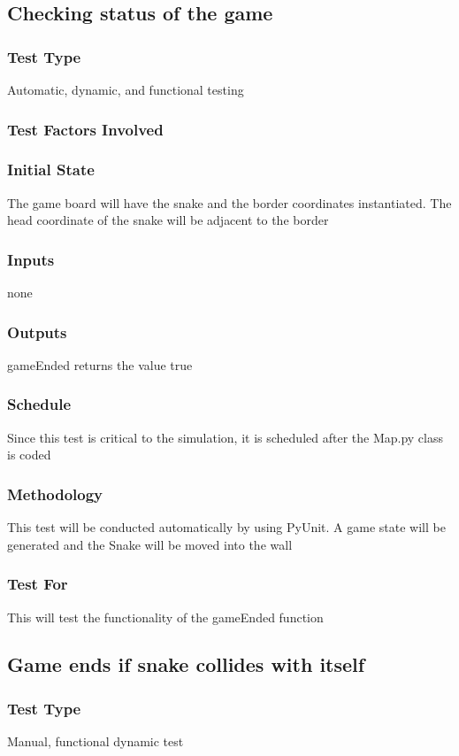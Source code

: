 \documentclass[12pt]{article}
\begin{document}
\noindent
\subsection{Checking status of the game}
\subsubsection*{Test Type}
Automatic, dynamic, and functional testing
\subsubsection*{Test Factors Involved}
\subsubsection*{Initial State}
The game board will have the snake and the border coordinates instantiated. The head coordinate of the snake will be adjacent to the border 
\subsubsection*{Inputs}
none
\subsubsection*{Outputs}
gameEnded returns the value true
\subsubsection*{Schedule}
Since this test is critical to the simulation, it is scheduled after the Map.py class is coded
\subsubsection*{Methodology}
This test will be conducted automatically by using PyUnit. A game state will be generated and the Snake will be moved into the wall
\subsubsection*{Test For}
This will test the functionality of the gameEnded function \newline

\noindent
\subsection{Game ends if snake collides with itself}
\subsubsection*{Test Type}
Manual, functional dynamic test
\end{document}

